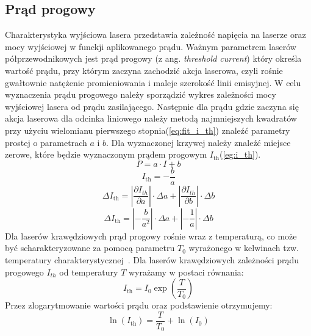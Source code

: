 \subsection{Prąd progowy}
Charakterystyka wyjściowa lasera przedstawia zależność napięcia na laserze oraz mocy wyjściowej w funckji aplikowanego prądu.
Ważnym parametrem laserów półprzewodnikowych jest prąd progowy (z ang. \textit{threshold
current}) który określa wartość prądu, przy którym zaczyna zachodzić akcja laserowa, czyli
rośnie gwałtownie natężenie promieniowania i maleje szerokość linii emisyjnej. W celu wyznaczenia prądu progowego należy
sporządzić wykres zależności mocy wyjściowej lasera od prądu zasilającego. Następnie dla prądu gdzie zaczyna się akcja
laserowa dla odcinka liniowego należy metodą najmniejszych kwadratów przy użyciu wielomianu pierwszego stopnia(\ref{eq:fit_i_th})
 znaleźć parametry prostej o parametrach $a$ i $b$.
 Dla wyznaczonej krzywej należy znaleźć miejsce zerowe, które będzie wyznaczonym prądem progowym $I_{\mathrm{th}}$(\ref{eg:i_th}).
\begin{equation}
\label{eq:fit_i_th}
P = a \cdot I + b
\end{equation}
\begin{equation}
\label{eg:i_th}
I_{\mathrm{th}} = -\frac{b}{a}
\end{equation}
\begin{equation}
\Delta I_{\mathrm{th}} = \left\lvert \frac{\partial I_{th}}{\partial a} \right\rvert \cdot \Delta a + \left\lvert \frac{\partial I_{th}}{\partial b} \right\rvert \cdot \Delta b
\end{equation}
\begin{equation}
\Delta I_{\mathrm{th}} = \left\lvert -\frac{b}{a^2} \right\rvert \cdot \Delta a + \left\lvert -\frac{1}{a} \right\rvert \cdot \Delta b
\end{equation}
Dla laserów krawędziowych prąd progowy rośnie wraz z temperaturą, co może być scharakteryzowane za pomocą parametru
$T_{0}$ wyrażonego w kelwinach tzw. temperatury charakterystycznej~\cite{opto_book}.
Dla laserów krawędziowych zależności prądu progowego $I_{th}$ od temperatury $T$ wyrażamy w postaci równania:
\begin{equation}
\label{eq:i_th}
I_{\mathrm{th}} = I_0 \exp \left( \frac{T}{T_0} \right)
\end{equation}
Przez zlogarytmowanie wartości prądu oraz podstawienie otrzymujemy:
\begin{equation}
\ln(I_{\mathrm{th}}) =    \frac{T}{T_0}  + \ln(I_0)
\end{equation}

